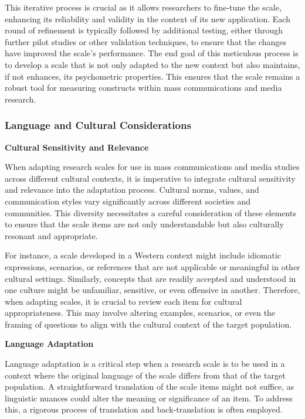 \documentclass[
]{book}
\begin{document}
This iterative process is crucial as it allows researchers to fine-tune the scale, enhancing its reliability and validity in the context of its new application. Each round of refinement is typically followed by additional testing, either through further pilot studies or other validation techniques, to ensure that the changes have improved the scale's performance. The end goal of this meticulous process is to develop a scale that is not only adapted to the new context but also maintains, if not enhances, its psychometric properties. This ensures that the scale remains a robust tool for measuring constructs within mass communications and media research.

\hypertarget{language-and-cultural-considerations}{%
\subsubsection*{Language and Cultural Considerations}\label{language-and-cultural-considerations}}

\textbf{Cultural Sensitivity and Relevance}

When adapting research scales for use in mass communications and media studies across different cultural contexts, it is imperative to integrate cultural sensitivity and relevance into the adaptation process. Cultural norms, values, and communication styles vary significantly across different societies and communities. This diversity necessitates a careful consideration of these elements to ensure that the scale items are not only understandable but also culturally resonant and appropriate.

For instance, a scale developed in a Western context might include idiomatic expressions, scenarios, or references that are not applicable or meaningful in other cultural settings. Similarly, concepts that are readily accepted and understood in one culture might be unfamiliar, sensitive, or even offensive in another. Therefore, when adapting scales, it is crucial to review each item for cultural appropriateness. This may involve altering examples, scenarios, or even the framing of questions to align with the cultural context of the target population.

\textbf{Language Adaptation}

Language adaptation is a critical step when a research scale is to be used in a context where the original language of the scale differs from that of the target population. A straightforward translation of the scale items might not suffice, as linguistic nuances could alter the meaning or significance of an item. To address this, a rigorous process of translation and back-translation is often employed.
\end{document}
